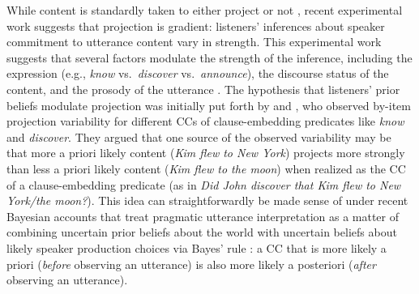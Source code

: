 \documentclass[OpenMind]{stjour}
\begin{document}
While content is standardly taken to either project or not \citep{beaver-geurts-sep}, recent experimental work suggests that projection is gradient: listeners' inferences about speaker commitment to utterance content vary in strength.  This experimental work suggests that several factors modulate the strength of the inference, including the expression (e.g., {\em know} vs.\ {\em discover} vs.\ {\em announce}), the discourse status of the content, and the prosody of the utterance \citep[for an overview see][]{tbd-variability}. The hypothesis that listeners' prior beliefs modulate projection was initially put forth by \citet{stevens-etal2017} and \citet{tbd-variability}, who observed by-item projection variability for different CCs of clause-embedding predicates like \emph{know} and \emph{discover}. They argued that one source of the observed variability may be that more a priori likely content ({\em Kim flew to New York}) projects more strongly than less a priori likely content  ({\em Kim flew to the moon}) when realized as the CC of a clause-embedding predicate (as in \emph{Did John discover that Kim flew to New York/the moon?}). This idea can straightforwardly be made sense of under recent Bayesian accounts that treat pragmatic utterance interpretation as a matter of combining uncertain prior beliefs about the world with uncertain beliefs about likely speaker production choices via Bayes' rule \citep{GoodmanFrank2016, degen-etal2015}: a CC that is more likely a priori (\emph{before} observing an utterance) is also more likely a posteriori (\emph{after} observing an utterance).

\end{document}
